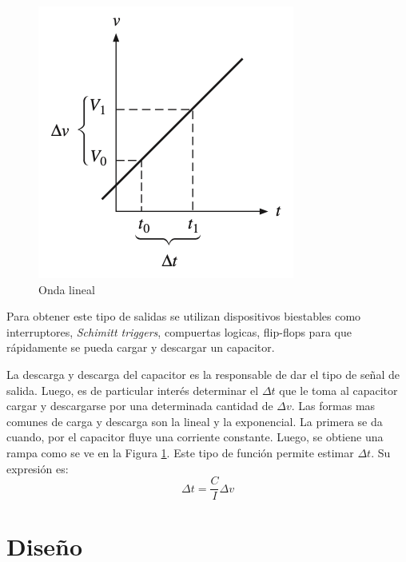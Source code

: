     \begin{figure}
        \includegraphics[width=0.9\linewidth]{../Ex3/Resources/lineal_waveform.png}
        \caption{Onda lineal}
        \label{fig:ej3_lineal_waveform}
        \end{figure}
    
    Para obtener este tipo de salidas se utilizan dispositivos biestables como interruptores, \textit{Schimitt triggers}, compuertas logicas, flip-flops para que rápidamente se pueda cargar y descargar un capacitor.
    

    La descarga y descarga del capacitor es la responsable de dar el tipo de señal de salida. Luego, es de particular interés determinar el $\Delta t$ que le toma al capacitor cargar y descargarse por una determinada cantidad de $\Delta v$. Las formas mas comunes de carga y descarga son la lineal y la exponencial. La primera se da cuando, por el capacitor fluye una corriente constante. Luego, se obtiene una rampa como se ve en la Figura \ref{fig:ej3_lineal_waveform}. Este tipo de función permite estimar  $\Delta t$. Su expresión es:
	\begin{equation}
        \Delta t = \frac{C}{I} \Delta v
        \label{eq:delta_t}
    \end{equation} 

\section{Diseño}

